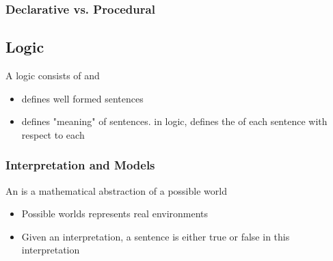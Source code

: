\subsubsection{Declarative vs. Procedural}

\begin{center}
\end{center}
\begin{Parallel}[v]{0.48\textwidth}{0.48\textwidth}
\ParallelPar
\end{Parallel}

\subsection{Logic}

A logic consists of  and 
\begin{itemize}
\item {} defines well formed sentences
\item {} defines "meaning" of sentences. in logic, defines the  of each sentence with respect to each 
\end{itemize}

\subsubsection{Interpretation and Models}

An  is a mathematical abstraction of a possible world
\begin{itemize}
\item Possible worlds represents real environments
\item Given an interpretation, a sentence is either true or false in this interpretation
\end{itemize}

